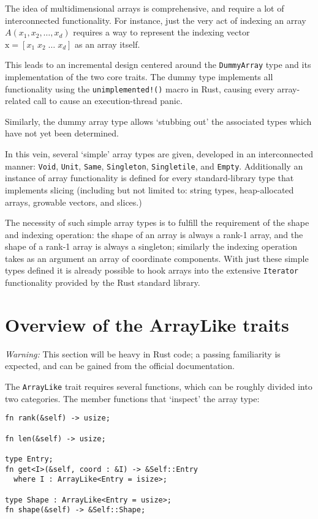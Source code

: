\documentclass{DIKU-report-variant}
\newcommand\mrm[1]{\mathrm{#1}}
\newcommand\brm[1]{\bm{\mrm{#1}}}
\begin{document}
The idea of multidimensional arrays is comprehensive, and require a lot of interconnected functionality.
For instance, just the very act of indexing an array \(A(x_1, x_2, \dots, x_d)\) requires a way to represent
the indexing vector \(\brm x = [x_1\; x_2\; \dots\;x_d]\) as an array itself.

This leads to an incremental design centered around the \texttt{DummyArray} type and its implementation of
the two core traits. The dummy type implements all functionality using the \texttt{unimplemented!()} macro
in Rust, causing every array-related call to cause an execution-thread panic.

Similarly, the dummy array type allows `stubbing out' the associated types which have not yet been determined.

In this vein, several `simple' array types are given, developed in an interconnected manner: \texttt{Void},
\texttt{Unit}, \texttt{Same}, \texttt{Singleton}, \texttt{Singletile}, and \texttt{Empty}. Additionally
an instance of array functionality is defined for every standard-library type that implements slicing
(including but not limited to: string types, heap-allocated arrays, growable vectors, and slices.)

The necessity of such simple array types is to fulfill the requirement of the shape and indexing operation: the
shape of an array is always a rank-1 array, and the shape of a rank-1 array is always a singleton; similarly
the indexing operation takes as an argument an array of coordinate components. With just these simple types defined
it is already possible to hook arrays into the extensive \texttt{Iterator} functionality provided by the Rust
standard library.

\section{Overview of the ArrayLike traits}

\textit{Warning:} This section will be heavy in Rust code; a passing familiarity is expected, and can
be gained from the official documentation\cite{RDOC117}.

The \texttt{ArrayLike} trait requires several functions, which can be roughly divided into two categories.
The member functions that `inspect' the array type:

\begin{lstlisting}
fn rank(&self) -> usize;

fn len(&self) -> usize;

type Entry;
fn get<I>(&self, coord : &I) -> &Self::Entry
  where I : ArrayLike<Entry = isize>;

type Shape : ArrayLike<Entry = usize>;
fn shape(&self) -> &Self::Shape;
\end{lstlisting}
\end{document}
